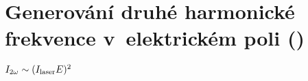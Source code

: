 \chapter[\EFISH]{Generování druhé harmonické frekvence v~elektrickém poli (\EFISH)}
\label{sec:efishth}
$I_{2\omega} \sim (I_\mathrm{laser} E)^2$

